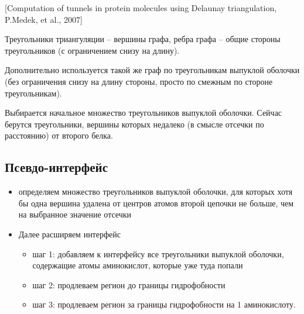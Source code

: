 \begin{center}

[Computation of tunnels in protein molecules using
Delaunay triangulation, P.Medek, et al., 2007]
\end{center}

Треугольники триангуляции -- вершины графа, ребра графа -- общие стороны треугольников (с ограничением снизу на длину).

Дополнительно используется такой же граф по треугольникам выпуклой оболочки (без ограничения снизу на длину стороны, просто по смежным по стороне треугольникам).

Выбирается начальное множество треугольников выпуклой оболочки. Сейчас берутся треугольники, вершины которых недалеко (в смысле отсечки по расстоянию) от второго белка.

\subsection{Псевдо-интерфейс}
\begin{itemize}
\item определяем множество треугольников выпуклой оболочки, для которых хотя бы одна вершина удалена от центров атомов второй цепочки не больше, чем на выбранное значение отсечки
\item Далее расширяем интерфейс
\begin{itemize}
\item шаг 1: добавляем к интерфейсу все треугольники выпуклой оболочки, содержащие атомы аминокислот, которые уже туда попали
\item шаг 2: продлеваем регион до границы гидрофобности
\item шаг 3: продлеваем регион за границы гидрофобности на 1 аминокислоту.
\end{itemize}
\end{itemize}


